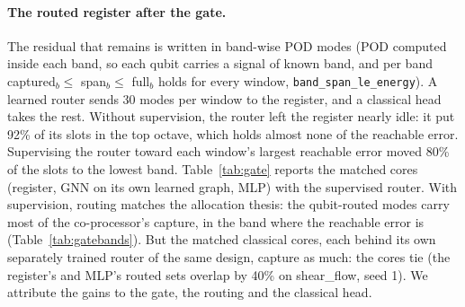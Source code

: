 \documentclass{article}
\begin{document}
\paragraph{The routed register after the gate.} The residual that remains is written in band-wise POD modes (POD
computed inside each band, so each qubit carries a signal of known band, and per band captured$_b\le$ span$_b\le$
full$_b$ holds for every window, \texttt{band\_span\_le\_energy}). A learned router sends 30 modes per window to the
register, and a classical head takes the rest. Without supervision, the router left the register nearly idle: it put 92\% of its slots in
the top octave, which holds almost none of the reachable error. Supervising the router toward each window's largest
reachable error moved 80\% of the slots to the lowest band. Table~\ref{tab:gate} reports the matched cores
(register, GNN on its own learned graph, MLP) with the supervised router. With supervision, routing matches the allocation
thesis: the qubit-routed modes carry most of the co-processor's capture, in the band where the reachable error is
(Table~\ref{tab:gatebands}). But the matched classical cores, each behind its own separately trained router of the same design, capture as much: the cores
tie (the register's and MLP's routed sets overlap by 40\% on shear\_flow, seed 1).
We attribute the gains to the gate, the routing and the classical head.
\end{document}
